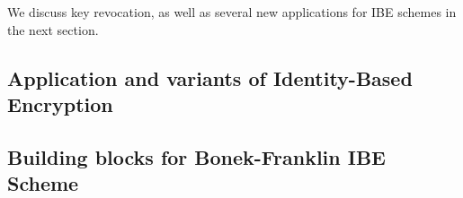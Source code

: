 


We discuss key revocation, as well as several new
applications for IBE schemes in the next section.

\subsection{Application and variants of Identity-Based Encryption }

\subsection{Building blocks for Bonek-Franklin IBE Scheme}



